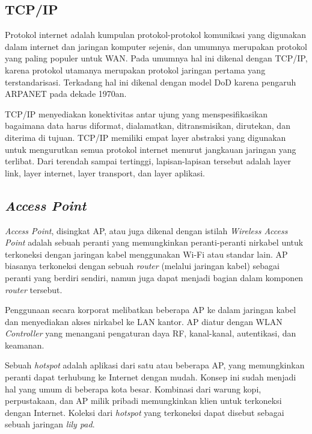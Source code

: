   \subsection{TCP/IP}
    Protokol internet adalah kumpulan protokol-protokol komunikasi yang digunakan dalam internet dan jaringan komputer sejenis, dan umumnya merupakan protokol yang paling populer untuk WAN. Pada umumnya hal ini dikenal dengan TCP/IP, karena protokol utamanya merupakan protokol jaringan pertama yang terstandarisasi. Terkadang hal ini dikenal dengan model DoD karena pengaruh ARPANET pada dekade 1970an.

    TCP/IP menyediakan konektivitas antar ujung yang menspesifikasikan bagaimana data harus diformat, dialamatkan, ditransmisikan, dirutekan, dan diterima di tujuan. TCP/IP memiliki empat layer abstraksi yang digunakan untuk mengurutkan semua protokol internet menurut jangkauan jaringan yang terlibat. Dari terendah sampai tertinggi, lapisan-lapisan tersebut adalah layer link, layer internet, layer transport, dan layer aplikasi.

  \subsection{\emph{Access Point}}
    \emph{Access Point}, disingkat AP, atau juga dikenal dengan istilah \emph{Wireless Access Point} adalah sebuah peranti yang memungkinkan peranti-peranti nirkabel untuk terkoneksi dengan jaringan kabel menggunakan Wi-Fi atau standar lain. AP biasanya terkoneksi dengan sebuah \emph{router} (melalui jaringan kabel) sebagai peranti yang berdiri sendiri, namun juga dapat menjadi bagian dalam komponen \emph{router} tersebut.

    Penggunaan secara korporat melibatkan beberapa AP ke dalam jaringan kabel dan menyediakan akses nirkabel ke LAN kantor. AP diatur dengan WLAN \emph{Controller} yang menangani pengaturan daya RF, kanal-kanal, autentikasi, dan keamanan.
    
    Sebuah \emph{hotspot} adalah aplikasi dari satu atau beberapa AP, yang memungkinkan peranti dapat terhubung ke Internet dengan mudah. Konsep ini sudah menjadi hal yang umum di beberapa kota besar. Kombinasi dari warung kopi, perpustakaan, dan AP milik pribadi memungkinkan klien untuk terkoneksi dengan Internet. Koleksi dari \emph{hotspot} yang terkoneksi dapat disebut sebagai sebuah jaringan \emph{lily pad}.

